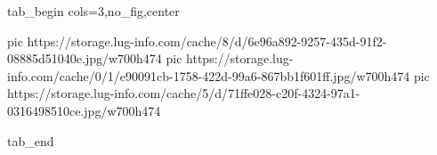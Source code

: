  
 
 
 
 


\ifcmt
  tab_begin cols=3,no_fig,center

     pic https://storage.lug-info.com/cache/8/d/6e96a892-9257-435d-91f2-08885d51040e.jpg/w700h474%
		 pic https://storage.lug-info.com/cache/0/1/e90091cb-1758-422d-99a6-867bb1f601ff.jpg/w700h474%
		 pic https://storage.lug-info.com/cache/5/d/71ffe028-c20f-4324-97a1-0316498510ce.jpg/w700h474%

  tab_end
\fi
